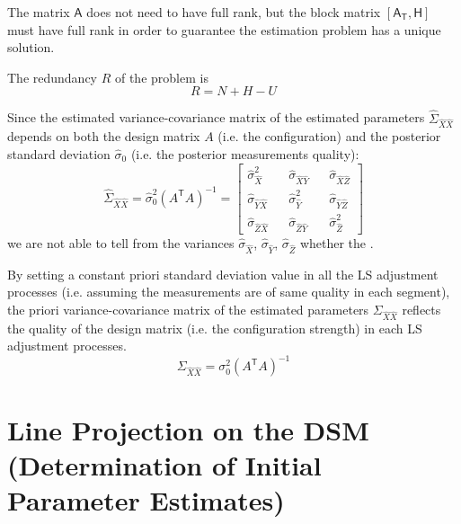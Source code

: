 The matrix $\mathsf{A}$ does not need to have full rank, but the block matrix $[\mathsf{A_T},\mathsf{H}]$ must have full rank in order to guarantee the estimation problem has a unique solution.



The redundancy $R$ of the problem is
\begin{equation}
R=N+H-U
\end{equation}






Since the estimated variance-covariance matrix of the estimated parameters $\hat{\Sigma}_{\hat{X}\hat{X}}$ depends on both the design matrix $A$ (i.e. the configuration) and the posterior standard deviation $\hat{\sigma}_0$ (i.e. the posterior measurements quality):
\begin{equation}
\hat{\Sigma}_{\hat{X}\hat{X}}=\hat{\sigma}_0^2(A^\mathsf{T}A)^{-1}=
\begin{bmatrix}
\hat{\sigma}_{\hat{X}}^2 && \hat{\sigma}_{\hat{X}\hat{Y}} && \hat{\sigma}_{\hat{X}\hat{Z}} \\
\hat{\sigma}_{\hat{Y}\hat{X}} && \hat{\sigma}_{\hat{Y}}^2 && \hat{\sigma}_{\hat{Y}\hat{Z}} \\
\hat{\sigma}_{\hat{Z}\hat{X}} && \hat{\sigma}_{\hat{Z}\hat{Y}} && \hat{\sigma}_{\hat{Z}}^2
\end{bmatrix}
\end{equation}
we are not able to tell from the variances $\hat{\sigma}_{\hat{X}}$, $\hat{\sigma}_{\hat{Y}}$, $\hat{\sigma}_{\hat{Z}}$ whether the .

By setting a constant priori standard deviation value in all the LS adjustment processes (i.e. assuming the measurements are of same quality in each segment), the priori variance-covariance matrix of the estimated parameters $\Sigma_{\hat{X}\hat{X}}$ reflects the quality of the design matrix (i.e. the configuration strength) in each LS adjustment processes.
\begin{equation}
\Sigma_{\hat{X}\hat{X}}=\sigma_0^2(A^\mathsf{T}A)^{-1}
\end{equation}

\clearpage
\section{Line Projection on the DSM (Determination of Initial Parameter Estimates)}
\label{sec:LineProjectionOnDSM}

